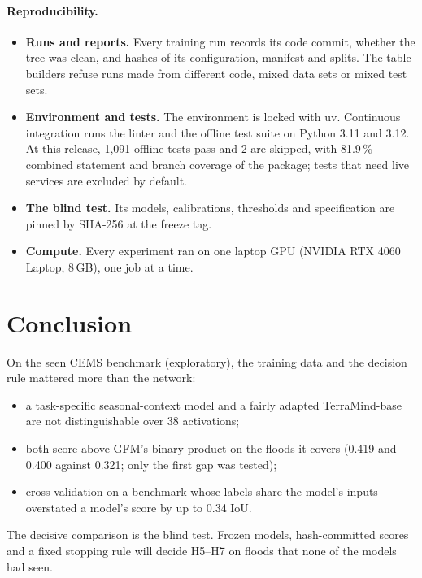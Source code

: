 \documentclass[10pt,twocolumn,a4paper]{article}
\newcommand{\pp}{\,\%}
\begin{document}
\paragraph{Reproducibility.}
\begin{itemize}
  \item \textbf{Runs and reports.} Every training run records its code commit, whether the tree was clean, and hashes
    of its configuration, manifest and splits. The table builders refuse runs made from different code, mixed data
    sets or mixed test sets.
  \item \textbf{Environment and tests.} The environment is locked with uv. Continuous integration runs the linter and
    the offline test suite on Python 3.11 and 3.12. At this release, 1,091 offline tests pass and 2 are skipped, with
    81.9\pp{} combined statement and branch coverage of the package; tests that need live services are excluded by
    default.
  \item \textbf{The blind test.} Its models, calibrations, thresholds and specification are pinned by SHA-256 at the
    freeze tag.
  \item \textbf{Compute.} Every experiment ran on one laptop GPU (NVIDIA RTX 4060 Laptop, 8\,GB), one job at a time.
\end{itemize}

\section{Conclusion}
On the seen CEMS benchmark (exploratory), the training data and the decision rule mattered more than the network:
\begin{itemize}
  \item a task-specific seasonal-context model and a fairly adapted TerraMind-base are not distinguishable over 38
    activations;
  \item both score above GFM's binary product on the floods it covers (0.419 and 0.400 against 0.321; only the first
    gap was tested);
  \item cross-validation on a benchmark whose labels share the model's inputs overstated a model's score by up to
    0.34 IoU.
\end{itemize}
The decisive comparison is the blind test. Frozen models, hash-committed scores and a fixed stopping rule will decide
H5--H7 on floods that none of the models had seen.
\end{document}
